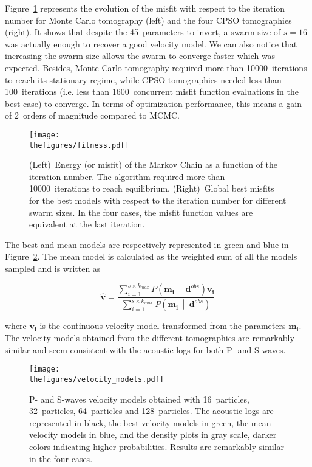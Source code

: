 Figure~\ref{fig:fitness} represents the evolution of the misfit with respect to the iteration number for Monte Carlo tomography (left) and the four CPSO tomographies (right). It shows that despite the 45~parameters to invert, a swarm size of $s = 16$ was actually enough to recover a good velocity model. We can also notice that increasing the swarm size allows the swarm to converge faster which was expected. Besides, Monte Carlo tomography required more than 10000~iterations to reach its stationary regime, while CPSO tomographies needed less than 100~iterations (i.e. less than 1600~concurrent misfit function evaluations in the best case) to converge. In terms of optimization performance, this means a gain of 2~orders of magnitude compared to MCMC.

\begin{figure}[!htbp]
	\centering
	\texttt{[image: \\thefigures/fitness.pdf]}
	\caption{(Left)~Energy (or misfit) of the Markov Chain as a function of the iteration number. The algorithm required more than 10000~iterations to reach equilibrium. (Right)~Global best misfits for the best models with respect to the iteration number for different swarm sizes. In the four cases, the misfit function values are equivalent at the last iteration.}
	\label{fig:fitness}
\end{figure}

The best and mean models are respectively represented in green and blue in Figure~\ref{fig:velocity_models}. The mean model is calculated as the weighted sum of all the models sampled and is written as

\begin{equation}
	\hat{\mathbf{v}} = \frac{\sum_{i = 1}^{s \times k_{max}} P \left( \mathbf{m_{i}} \ \middle| \  \mathbf{d}^{obs} \right) \mathbf{v_{i}}}{\sum_{i = 1}^{s \times k_{max}} P \left( \mathbf{m_{i}} \ \middle| \  \mathbf{d}^{obs} \right)}
	\label{eq:mean_model}
\end{equation}

\noindent where $\mathbf{v_{i}}$ is the continuous velocity model transformed from the parameters $\mathbf{m_{i}}$. The velocity models obtained from the different tomographies are remarkably similar and seem consistent with the acoustic logs for both P- and S-waves.

\begin{figure}[!htbp]
	\centering
	\texttt{[image: \\thefigures/velocity\_models.pdf]}
	\caption{P- and S-waves velocity models obtained with 16~particles, 32~particles, 64~particles and 128~particles. The acoustic logs are represented in black, the best velocity models in green, the mean velocity models in blue, and the density plots in gray scale, darker colors indicating higher probabilities. Results are remarkably similar in the four cases.}
	\label{fig:velocity_models}
\end{figure}


